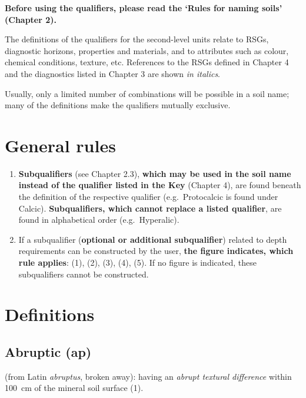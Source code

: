 \documentclass[
  letterpaper,
  DIV=11,
  numbers=noendperiod]{scrreprt}
\begin{document}
{\textbf{Before using the qualifiers, please read the `Rules for naming
soils' (Chapter 2).}}

The definitions of the qualifiers for the second-level units relate to
RSGs, diagnostic horizons, properties and materials, and to attributes
such as colour, chemical conditions, texture, etc. References to the
RSGs defined in Chapter 4 and the diagnostics listed in Chapter 3 are
shown \emph{in italics}.

Usually, only a limited number of combinations will be possible in a
soil name; many of the definitions make the qualifiers mutually
exclusive.

\hypertarget{general-rules}{%
\section{General rules}\label{general-rules}}

\begin{enumerate}
\def\labelenumi{\arabic{enumi}.}
\item
  \textbf{Subqualifiers} (see Chapter 2.3), \textbf{which may be used in
  the soil name instead of the qualifier listed in the Key} (Chapter 4),
  are found beneath the definition of the respective qualifier
  (e.g.~Protocalcic is found under Calcic). \textbf{Subqualifiers, which
  cannot replace a listed qualifier}, are found in alphabetical order
  (e.g.~Hyperalic).
\item
  If a subqualifier (\textbf{optional or additional subqualifier})
  related to depth requirements can be constructed by the user,
  \textbf{the figure indicates, which rule applies}: (1), (2), (3), (4),
  (5). If no figure is indicated, these subqualifiers cannot be
  constructed.
\end{enumerate}

\hypertarget{definitions}{%
\section{Definitions}\label{definitions}}

\hypertarget{abruptic-ap}{%
\subsection{Abruptic (ap)}\label{abruptic-ap}}

(from Latin \emph{abruptus}, broken away): having an \emph{abrupt
textural difference} within 100~cm of the mineral soil surface (1).
\end{document}
